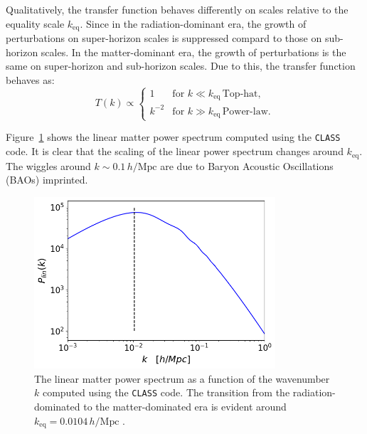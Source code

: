 Qualitatively, the transfer function behaves differently on scales relative to
the equality scale \( k_{\text{eq}} \).
Since in the radiation-dominant era, the growth of perturbations on super-horizon scales is suppressed compard to those on sub-horizon scales. In the matter-dominant era, the growth of perturbations is the same on super-horizon and sub-horizon scales. Due to this, the transfer function behaves as:
\begin{equation}
    T(k) \propto 
    \begin{cases}
        1 & \text{for } k \ll k_{\text{eq}}\, \text{Top-hat} , \\
        k^{-2} & \text{for } k \gg k_{\text{eq}}\, \text{Power-law}.
    \end{cases}
\end{equation}

Figure~\ref{fig:linear_power_spectrum} shows the linear matter power spectrum computed using the \texttt{CLASS} code. It is clear that the scaling of the linear power spectrum changes around $k_{\text{eq}}$. The wiggles around \( k \sim 0.1\, h/\text{Mpc} \) are due to Baryon Acoustic Oscillations (BAOs) imprinted.
\begin{figure}[ht]
    \centering
    \includegraphics[width=0.8\textwidth]{figures/class.png}
    \caption[Linear Matter Power Spectrum by \texttt{CLASS}]{The linear matter power spectrum as a function of the wavenumber \( k \) computed using the \texttt{CLASS} code. The transition from the radiation-dominated to the matter-dominated era is evident around \( k_{\text{eq}} = 0.0104\, h/\text{Mpc} \) \citep{2020A&A...641A...6P}.
    }
    \label{fig:linear_power_spectrum}
\end{figure}

